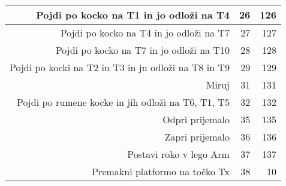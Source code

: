 \begin{table}[htbp]
\begin{tabular}{rrr}
    Pojdi po kocko na T1 in jo odloži na T4 & 26    & 126 \\ \hline
    Pojdi po kocko na T4 in jo odloži na T7 & 27    & 127 \\ \hline
    Pojdi po kocko na T7 in jo odloži na T10 & 28    & 128 \\ \hline
    Pojdi po kocki na T2 in T3 in ju odloži na T8 in T9 & 29    & 129 \\ \hline
    Miruj & 31    & 131 \\ \hline
    Pojdi po rumene kocke in jih odloži na T6, T1, T5 & 32    & 132 \\ \hline
    Odpri prijemalo & 35    & 135 \\ \hline
    Zapri prijemalo & 36    & 136 \\ \hline
    Postavi roko v lego Arm & 37    & 137 \\ \hline
    Premakni platformo na točko Tx & 38    & 10 \\
    \bottomrule
    \end{tabular}%
  \label{tab:kodenalog}%
\end{table}%
%
\newpage


